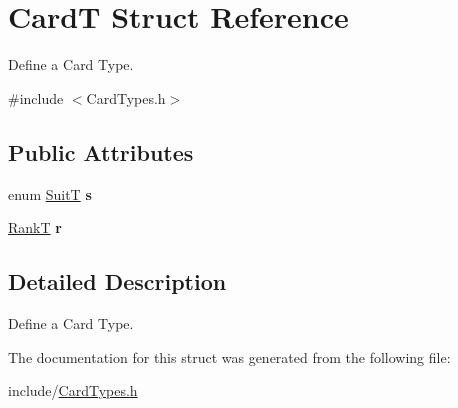 \hypertarget{struct_card_t}{}\section{CardT Struct Reference}
\label{struct_card_t}


Define a Card Type.  




{\ttfamily \#include $<$Card\+Types.\+h$>$}

\subsection*{Public Attributes}
\begin{DoxyCompactItemize}
\item 
\mbox{\label{struct_card_t_a5757f70e206dfab2ab865ef872fe4114}} 
enum \hyperlink{_card_types_8h_a693d1a7b7ef1b91ead9c7dfc49830565}{SuitT} {\bfseries s}
\item 
\mbox{\label{struct_card_t_a306faf354f2fb4bb43439f84bbc49f05}} 
\hyperlink{_card_types_8h_aa7b61ab74252d345d621b846db6238f1}{RankT} {\bfseries r}
\end{DoxyCompactItemize}


\subsection{Detailed Description}
Define a Card Type. 

The documentation for this struct was generated from the following file\+:\begin{DoxyCompactItemize}
\item 
include/\hyperlink{_card_types_8h}{Card\+Types.\+h}\end{DoxyCompactItemize}

